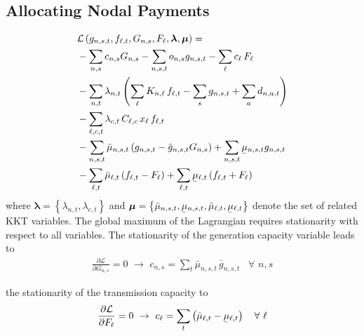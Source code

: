 \documentclass[11pt,twocolumn]{article}
\newcommand{\ubar}[1]{\underaccent{\bar}{#1}}
\newcommand{\generation}[1][n]{g_{#1,s,t}}
\newcommand{\generationpotential}{\bar{g}_{n,s,t}}
\newcommand{\capacityGeneration}{G_{n,s}}
\newcommand{\capacityFlow}{F_{\ell}}
\newcommand{\capexGeneration}{c_{n,s}}
\newcommand{\capexFlow}{c_{\ell}}
\newcommand{\opexGeneration}[1][n]{o_{#1,s}}
\newcommand{\demand}[1][n]{d_{#1,a,t}}
\newcommand{\incidence}[1][n]{K_{#1,\ell}}
\newcommand{\mulowergeneration}[1][n]{\ubar{\mu}_{#1,s,t}}
\newcommand{\muuppergeneration}[1][n]{\bar{\mu}_{#1,s,t}}
\newcommand{\mulowerflow}{\ubar{\mu}_{\ell,t}}
\newcommand{\muupperflow}{\bar{\mu}_{\ell,t}}
\newcommand{\lmp}[1][n]{\lambda_{#1,t}}
\newcommand{\flow}{f_{\ell,t}}
\newcommand{\cycle}{C_{\ell,c}}
\newcommand{\impedance}{x_\ell}
\newcommand{\cycleprice}{\lambda_{c,t}}
\newcommand{\lagrangian}{\mathcal{L}}
\newcommand{\Forall}[1]{\hspace{10pt} \forall \,\, #1 }
\newcommand{\pdv}[2]{\frac{\partial #1}{\partial #2}}
\begin{document}
\subsection{Allocating Nodal Payments}
\begin{align}
\notag
 & \lagrangian\left(\generation, \flow, \capacityGeneration, \capacityFlow, \boldsymbol{\lambda}, \boldsymbol{\mu} \right)   =   \\  
 \notag
 & - \sum_{n,s} \capexGeneration \capacityGeneration - \sum_{n, s, t} \opexGeneration \generation - \sum_{\ell} \capexFlow \, \capacityFlow  \\
 \notag
 &- \sum_{n,t} \lmp \left(\sum_\ell \incidence \, \flow  - \sum_s \generation + \sum_a \demand  \right)  \\ 
 \notag
 &- \sum_{\ell,c,t} \cycleprice \, \cycle \, \impedance \, \flow  \\
 \notag
 &- \sum_{n,s,t} \muuppergeneration \left( \generation - \generationpotential \capacityGeneration \right)  + \sum_{n,s,t} \mulowergeneration \generation  \\
 &- \sum_{\ell,t} \muupperflow \left( \flow - \capacityFlow \right) + \sum_{\ell,t} \mulowerflow \left( \flow + \capacityFlow \right)     
 \label{eq:full_lagrangian}
\end{align}
% 
where $\boldsymbol{\lambda} = \left\lbrace \lmp, \cycleprice \right\rbrace $ and $\boldsymbol{\mu} = \left\lbrace \muuppergeneration, \mulowergeneration, \muupperflow, \mulowerflow \right\rbrace $ denote the set of related KKT variables. The global maximum of the Lagrangian requires stationarity with respect to all variables. The stationarity of the generation capacity variable leads to 
\begin{align}
 \pdv{\lagrangian}{\capacityGeneration}  = 0 \,\, \rightarrow \,\, 
 \capexGeneration =  \sum_t \muuppergeneration \, \generationpotential  \Forall{n,s}
 \label{eq:capexGeneration_duality}
\end{align}

the stationarity of the transmission capacity to
\begin{align}
 \pdv{\lagrangian}{\capacityFlow} = 0 \,\, \rightarrow \,\, 
 \capexFlow =  \sum_t \left( \muupperflow - \mulowerflow \right) \Forall{\ell}
 \label{eq:capexFlow_duality}
\end{align}
\end{document}
